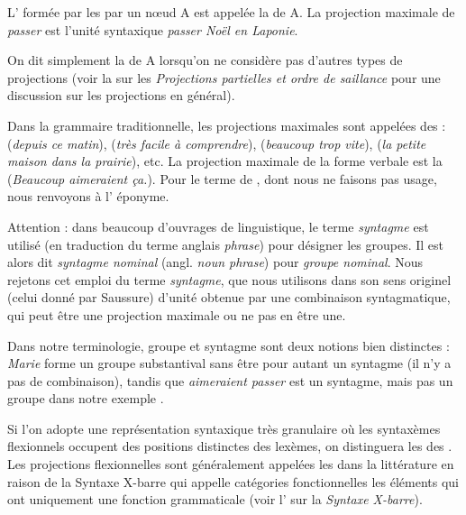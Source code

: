 {L’ formée par les  par un nœud A est appelée la  de A.}
La projection maximale de \textit{passer} est l’unité syntaxique \textit{passer Noël en Laponie}.

On dit simplement la  de A lorsqu’on ne considère pas d’autres types de projections (voir la  sur les \textit{Projections partielles et ordre de saillance} pour une discussion sur les projections en général).

Dans la grammaire traditionnelle, les projections maximales sont appelées des  :  (\textit{depuis ce matin}),  (\textit{très facile à comprendre}),  (\textit{beaucoup trop vite}),  (\textit{la petite maison dans la prairie}), etc. La projection maximale de la forme verbale est la  (\textit{Beaucoup aimeraient ça.}). Pour le terme de , dont nous ne faisons pas usage, nous renvoyons à l’ éponyme.

\begin{tblsframed}{}
\noindent Attention : dans beaucoup d’ouvrages de linguistique, le terme \textit{syntagme} est utilisé (en traduction du terme anglais \textit{phrase}) pour désigner les groupes. Il est alors dit \textit{syntagme nominal} (angl. \textit{noun phrase}) pour \textit{groupe nominal}. Nous rejetons cet emploi du terme \textit{syntagme}, que nous utilisons dans son sens originel (celui donné par Saussure) d’unité obtenue par une combinaison syntagmatique, qui peut être une projection maximale ou ne pas en être une.

Dans notre terminologie, groupe et syntagme sont deux notions bien distinctes : \textit{Marie} forme un groupe substantival sans être pour autant un syntagme (il n’y a pas de combinaison), tandis que \textit{aimeraient passer} est un syntagme, mais pas un groupe dans notre exemple .
\end{tblsframed}



Si l’on adopte une représentation syntaxique très granulaire où les syntaxèmes flexionnels occupent des positions distinctes des lexèmes, on distinguera les  des . Les projections flexionnelles sont généralement appelées les  dans la littérature en raison de la Syntaxe X-barre qui appelle catégories fonctionnelles les éléments qui ont uniquement une fonction grammaticale (voir l’ sur la \textit{Syntaxe X-barre}).\largerpage[2]

